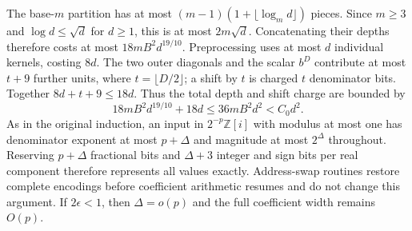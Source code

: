 The base-$m$ partition has at most $(m-1)(1+\lfloor\log_m d\rfloor)$
pieces. Since $m\ge3$ and $\log d\le\sqrt d$ for $d\ge1$, this is at most
$2m\sqrt d$. Concatenating their depths therefore costs at most
$18mB^2d^{19/10}$. Preprocessing uses at most $d$ individual kernels, costing
$8d$. The two outer diagonals and the scalar $b^D$ contribute at most
$t+9$ further units, where $t=\lfloor D/2\rfloor$; a shift by $t$ is charged
$t$ denominator bits. Together $8d+t+9\le18d$. Thus the total depth and
shift charge are bounded by
\[
 18mB^2d^{19/10}+18d\le36mB^2d^2<C_0d^2.
\]
As in the original induction, an input in $2^{-p}\mathbb Z[i]$ with modulus
at most one has denominator exponent at most $p+\Delta$ and magnitude at most
$2^\Delta$ throughout. Reserving $p+\Delta$ fractional bits and $\Delta+3$
integer and sign bits per real component therefore represents all values
exactly. Address-swap routines restore complete encodings before coefficient
arithmetic resumes and do not change this argument. If $2\epsilon<1$, then
$\Delta=o(p)$ and the full coefficient width remains $O(p)$.

